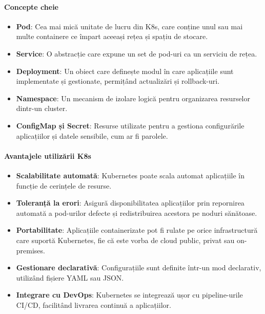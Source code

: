 \documentclass[titlepage,12pt]{article}
\begin{document}
\paragraph{Concepte cheie}
\begin{itemize}
\item \textbf{Pod}: Cea mai mică unitate de lucru din \ac {K8s}, care conține unul sau mai multe containere ce împart aceeași rețea și spațiu de stocare.
\item \textbf{Service}: O abstracție care expune un set de pod-uri ca un serviciu de rețea.
\item \textbf{Deployment}: Un obiect care definește modul în care aplicațiile sunt implementate și gestionate, permițând actualizări și rollback-uri.
\item \textbf{Namespace}: Un mecanism de izolare logică pentru organizarea resurselor dintr-un cluster.
\item \textbf{ConfigMap și Secret}: Resurse utilizate pentru a gestiona configurările aplicațiilor și datele sensibile, cum ar fi parolele.
\end{itemize}

\paragraph{Avantajele utilizării \ac {K8s}}
\begin{itemize}
\item \textbf{Scalabilitate automată}: Kubernetes poate scala automat aplicațiile în funcție de cerințele de resurse.
\item \textbf{Toleranță la erori}: Asigură disponibilitatea aplicațiilor prin repornirea automată a pod-urilor defecte și redistribuirea acestora pe noduri sănătoase.
\item \textbf{Portabilitate}: Aplicațiile containerizate pot fi rulate pe orice infrastructură care suportă Kubernetes, fie că este vorba de cloud public, privat sau on-premises.
\item \textbf{Gestionare declarativă}: Configurațiile sunt definite într-un mod declarativ, utilizând fișiere YAML sau JSON.
\item \textbf{Integrare cu DevOps}: Kubernetes se integrează ușor cu pipeline-urile CI/CD, facilitând livrarea continuă a aplicațiilor.
\end{itemize}
\end{document}
